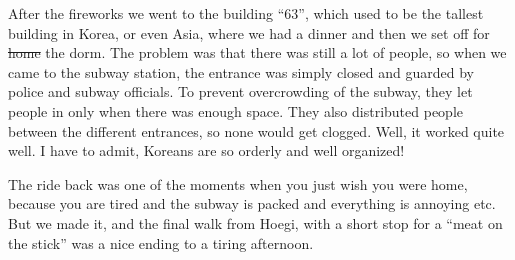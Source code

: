 \begin{post}
\begin{content}
After the fireworks we went to the building ``63'', which used to be the tallest building in Korea, or even Asia, where we had a dinner and then we set off for \sout{home} the dorm. The problem was that there was still a lot of people, so when we came to the subway station, the entrance was simply closed and guarded by police and subway officials. To prevent overcrowding of the subway, they let people in only when there was enough space. They also distributed people between the different entrances, so none would get clogged. Well, it worked quite well. I have to admit, Koreans are so orderly and well organized!

\begin{figure}[h]
\centering
{}
\end{figure}

The ride back was one of the moments when you just wish you were home, because you are tired and the subway is packed and everything is annoying etc. But we made it, and the final walk from Hoegi, with a short stop for a ``meat on the stick'' was a nice ending to a tiring afternoon.
\end{content}
\end{post}
